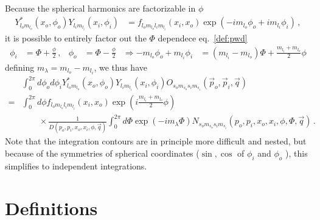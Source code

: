 \documentclass[onecolumn]{revtex4-2}
\begin{document}
Because the spherical harmonics are factorizable in $\phi$
\begin{align}
    Y_{l_o m_{l_o}}^*(x_o, \phi_o)
    Y_{l_i m_{l_i}}(x_i, \phi_i)
    &=
    f_{l_o m_{l_o} l_i m_{l_i}} (x_i, x_o)
    \exp\left(
    - i m_{l_o} \phi_o + i m_{l_i} \phi_i
    \right)\,,
\end{align}
it is possible to entirely factor out the $\Phi$ dependece eq.~\eqref{def:pwd}
\begin{align}
    \phi_i &= \Phi + \frac{\phi}{2} \,, &
    \phi_o &= \Phi - \frac{\phi}{2} &
    \Rightarrow
    - m_{l_o} \phi_o + m_{l_i} \phi_i
    &=
    (m_{l_i} -  m_{l_o}) \Phi + \frac{ m_{l_i} +  m_{l_o}}{2} \phi
\end{align}
defining $m_\lambda =  m_{l_o} -  m_{l_i}$, we thus have
\begin{align}
    &\int_{0}^{2\pi} d \phi_o d \phi_i
    Y_{l_o m_{l_o}}^*(x_o, \phi_o)
    Y_{l_i m_{l_i}}(x_i, \phi_i)
    O_{s_o m_{s_o} s_i m_{s_i}}(\vec p_o, \vec p_i, \vec q)
    \\ =&
    \int_{0}^{2\pi} d \phi
    f_{l_o m_{l_o} l_i m_{l_i}} (x_i, x_o)
    \exp\left(i\frac{ m_{l_i} +  m_{l_o}}{2} \phi\right)
    \\&\qquad\times
    \frac{1}{D(p_o, p_i, x_o, x_i, \phi, \vec q)}
    \int_{0}^{2\pi} d \Phi \exp\left(-i m_\lambda \Phi\right)
    N_{s_o m_{s_o} s_i m_{s_i}}(p_o, p_i, x_o, x_i, \phi, \Phi, \vec q)
    \,.
\end{align}
Note that the integration contours are in principle more difficult and nested, but because of the symmetries of spherical coordinates ($\sin, \cos$ of $\phi_i$ and $\phi_o$ ), this simplifies to independent integrations.

\section{Definitions}
\end{document}
